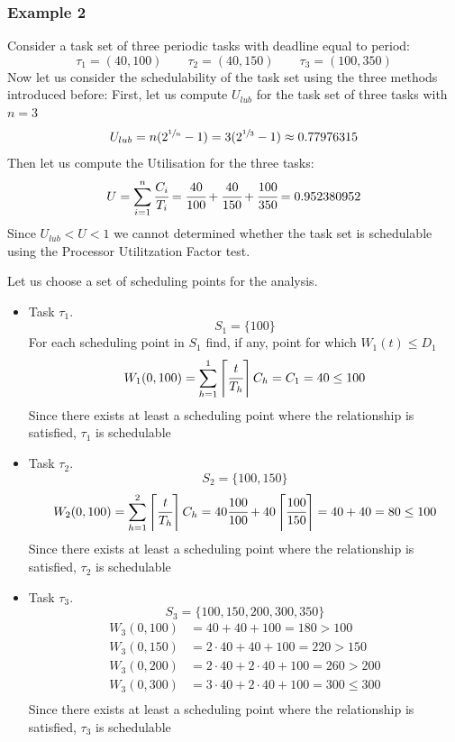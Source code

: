     \subsubsection{Example 2}
    Consider a task set of three periodic tasks with deadline equal to period:
    \[\tau_1 = (40,100)\qquad \tau_2 = (40, 150)\qquad \tau_3 = (100,350)\]
    Now let us consider the schedulability of the task set using the three methods introduced before:
    {
        First, let us compute $U_{lub}$ for the task set of three tasks with $n=3$
        \[U_{lub} = n(2^{\sfrac{1}{n}} - 1) = 3(2^{\sfrac{1}{3}} - 1) \approx 0.77976315\]
        Then let us compute the Utilisation for the three tasks:
        \[U = \sum_{i=1}^n \cfrac{C_i}{T_i} = \cfrac{40}{100} + \cfrac{40}{150} + \cfrac{100}{350} = 0.952380952\]
        Since $U_{lub} < U < 1$ we cannot determined whether the task set is schedulable using the Processor Utilitzation Factor test.
    }
    {
        Let us choose a set of scheduling points for the analysis.
        \begin{itemize}
            \item Task $\tau_1$.
            \[S_1 = \{100\}\]
            For each scheduling point in $S_1$ find, if any, point for which $W_1(t)\le D_1$
            \begin{align*}
                W_1(0,100) = \sum_{h=1}^1 \left\lceil \cfrac{t}{T_h} \right\rceil C_h = C_1 = 40 \le 100
            \end{align*}
            Since there exists at least a scheduling point where the relationship is satisfied, $\tau_1$ is schedulable
            \item Task $\tau_2$.
            \[S_2 = \{100, 150\}\]
            \begin{align*}
                W_2(0,100) = \sum_{h=1}^2 \left\lceil \cfrac{t}{T_h} \right\rceil C_h = 40\cfrac{100}{100} + 40 \left\lceil \cfrac{100}{150} \right\rceil = 40 + 40 = 80 \le 100
            \end{align*}
            Since there exists at least a scheduling point where the relationship is satisfied, $\tau_2$ is schedulable
            \item Task $\tau_3$.
            \[S_3 = \{100, 150, 200, 300, 350\}\]
            \begin{align*}
                W_3(0,100) &= 40 + 40 + 100 = 180 > 100\\
                W_3(0,150) &= 2\cdot 40 + 40  + 100 = 220 > 150\\
                W_3(0,200) &= 2\cdot 40 + 2\cdot 40 + 100 = 260 > 200 \\
                W_3(0,300) &= 3\cdot 40 + 2\cdot 40 + 100 = 300 \le 300\\
            \end{align*}
            Since there exists at least a scheduling point where the relationship is satisfied, $\tau_3$ is schedulable
        \end{itemize}
        }
